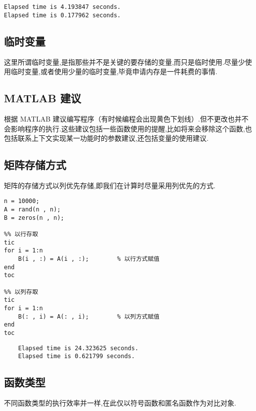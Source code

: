 \vspace{-0.8cm}
\begin{lstlisting}
Elapsed time is 4.193847 seconds.
Elapsed time is 0.177962 seconds.
\end{lstlisting}



\subsection{临时变量}
 这里所谓临时变量,是指那些并不是关键的要存储的变量,而只是临时使用.尽量少使用临时变量,或者使用少量的临时变量,毕竟申请内存是一件耗费的事情.



\subsection{MATLAB 建议}
 根据 MATLAB 建议编写程序（有时候编程会出现黄色下划线）.但不更改也并不会影响程序的执行.这些建议包括一些函数使用的提醒,比如将来会移除这个函数,也包括联系上下文实现某一功能时的参数建议,还包括变量的使用建议.



\subsection{矩阵存储方式}
 矩阵的存储方式以列优先存储,即我们在计算时尽量采用列优先的方式.

\vspace{-0.8cm}
\begin{lstlisting}[caption = 矩阵不同存取方式效率对比]
n = 10000;
A = rand(n , n);
B = zeros(n , n);

%% 以行存取
tic
for i = 1:n
    B(i , :) = A(i , :);        % 以行方式赋值 
end
toc

%% 以列存取
tic
for i = 1:n
    B(: , i) = A(: , i);        % 以列方式赋值
end
toc
\end{lstlisting}

  \vspace{-0.8cm}
  \begin{lstlisting}
    Elapsed time is 24.323625 seconds.
    Elapsed time is 0.621799 seconds.
  \end{lstlisting}

\subsection{函数类型}
 不同函数类型的执行效率并一样,在此仅以符号函数和匿名函数作为对比对象.

